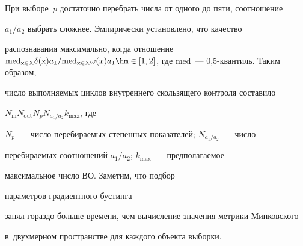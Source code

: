   При выборе~$p$ достаточно перебрать числа от одного до пяти, соотношение 

$a_1/a_2$ выбрать сложнее. Эмпирически установлено, что качество 

распознавания максимально, когда отношение $\mathrm{med}_{\mathrm{x}\in 

\mathrm{X}}\delta(\mathrm{x})a_1/\mathrm{med}_{\mathrm{x}\in \mathrm{X}} 

\omega(x)a_1\hm\in [1,2]$, где $\mathrm{med}$~--- 0,5-кван\-тиль. Таким образом, 

число выполняемых циклов внутреннего скользящего контроля составило 

$N_{\mathrm{in}} N_{\mathrm{out}} N_p N_{a_1/a_2} k_{\max}$, где  

$N_p$~--- число перебираемых степенных показателей; $N_{a_1/a_2}$~--- число 

перебираемых соотношений $a_1/a_2$; $k_{\max}$~--- предполагаемое 

максимальное число ВО. Заметим, что подбор\linebreak\vspace*{-12pt}






\noindent

 параметров градиентного бустинга 

занял гораздо больше времени, чем вычисление значения метрики Минковского 

в~двухмерном пространстве для каждого объекта выборки.









